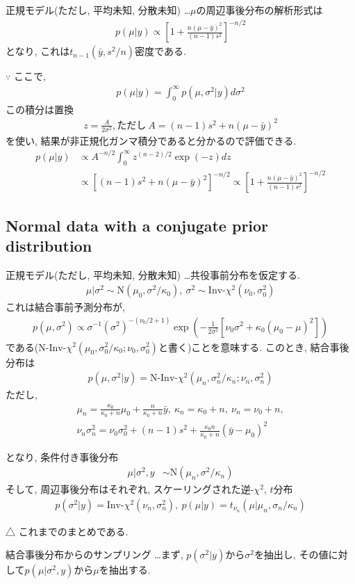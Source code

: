 \documentclass[11pt,a4pape,dvipdfmx]{jarticle}
\newcommand{\eqn}[1]{\begin{align*}#1\end{align*}}
\begin{document}
\begin{itembox}[l]{正規モデル(ただし, 平均未知, 分散未知)}
…$\mu$の周辺事後分布の解析形式は
\eqn{p(\mu|y)\propto \left[ 1+\frac{n(\mu-\bar{y})^2}{(n-1)s^2}\right]^{-n/2}}
となり, これは$t_{n-1}(\bar{y},s^2/n)$密度である.
\end{itembox}
$\because$
ここで,
\eqn{p(\mu|y)=\int_0^{\infty}p(\mu,\sigma^2|y)d\sigma^2}
この積分は置換
\eqn{z=\frac{A}{2\sigma^2}, \text{ただし}\ A=(n-1)s^2+n(\mu-\bar{y})^2}
を使い, 結果が非正規化ガンマ積分であると分かるので評価できる.
\eqn{p(\mu|y)&\propto A^{-n/2}\int_0^{\infty}z^{(n-2)/2}\exp(-z)dz\\
&\propto [(n-1)s^2+n(\mu-\bar{y})^2]^{-n/2}
\propto \left[ 1+\frac{n(\mu-\bar{y})^2}{(n-1)s^2}\right]^{-n/2}}

\subsection{Normal data with a conjugate prior distribution}

\begin{itembox}[l]{正規モデル(ただし, 平均未知, 分散未知)}
…共役事前分布を仮定する.
\eqn{\mu|\sigma^2\sim \text{N}(\mu_0,\sigma^2/\kappa_0),\ \sigma^2\sim \text{Inv-}\chi^2(\nu_0,\sigma_0^2)}
これは結合事前予測分布が,
\eqn{p(\mu,\sigma^2)\propto \sigma^{-1}(\sigma^2)^{-(\nu_0/2+1)}\exp\left(-\frac{1}{2\sigma^2}[\nu_0\sigma^2+\kappa_0(\mu_0-\mu)^2]\right)}
である($\text{N-Inv-}\chi^2(\mu_0,\sigma^2_0/\kappa_0;\nu_0,\sigma^2_0)$と書く)ことを意味する.
このとき, 結合事後分布は
\eqn{p(\mu,\sigma^2|y)=\text{N-Inv-}\chi^2(\mu_n,\sigma^2_n/\kappa_n;\nu_n,\sigma_n^2)}
ただし,
\eqn{\mu_n=\tfrac{\kappa_0}{\kappa_0+n}\mu_0+\tfrac{n}{\kappa_0+n}\bar{y},\ \kappa_n=\kappa_0+n,\ \nu_n=\nu_0+n,\\\nu_n\sigma_n^2=\nu_0\sigma^2_0+(n-1)s^2+\tfrac{\kappa_0n}{\kappa_0+n}(\bar{y}-\mu_0)^2}

となり, 条件付き事後分布
\eqn{\mu|\sigma^2,y&\sim\text{N}(\mu_n,\sigma^2/\kappa_n)}
そして, 周辺事後分布はそれぞれ, スケーリングされた逆-$\chi^2$, $t$分布
\eqn{p(\sigma^2|y)=\text{Inv-}\chi^2(\nu_n,\sigma_n^2),\ p(\mu|y)=t_{\nu_n}(\mu|\mu_n,\sigma_n/\kappa_n)}
\end{itembox}
△
これまでのまとめである.


\begin{itembox}[l]{結合事後分布からのサンプリング}
…まず, $p(\sigma^2|y)$から$\sigma^2$を抽出し, その値に対して$p(\mu|\sigma^2,y)$から$\mu$を抽出する.
\end{itembox}
\end{document}
